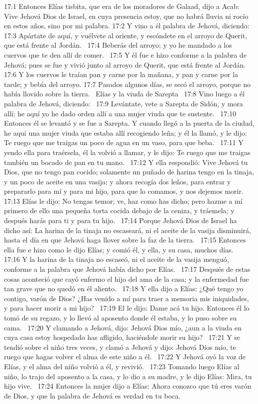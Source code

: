 17:1 Entonces Elías tisbita, que era de los moradores de Galaad, dijo a Acab: Vive Jehová Dios de Israel, en cuya presencia estoy, que no habrá lluvia ni rocío en estos años, sino por mi palabra. 
17:2 Y vino a él palabra de Jehová, diciendo:  
17:3 Apártate de aquí, y vuélvete al oriente, y escóndete en el arroyo de Querit, que está frente al Jordán.  
17:4 Beberás del arroyo; y yo he mandado a los cuervos que te den allí de comer.  
17:5 Y él fue e hizo conforme a la palabra de Jehová; pues se fue y vivió junto al arroyo de Querit, que está frente al Jordán.  
17:6 Y los cuervos le traían pan y carne por la mañana, y pan y carne por la tarde; y bebía del arroyo. 
17:7 Pasados algunos días, se secó el arroyo, porque no había llovido sobre la tierra.  
Elías y la viuda de Sarepta  
17:8 Vino luego a él palabra de Jehová, diciendo:  
17:9 Levántate, vete a Sarepta de Sidón, y mora allí; he aquí yo he dado orden allí a una mujer viuda que te sustente.  
17:10 Entonces él se levantó y se fue a Sarepta. Y cuando llegó a la puerta de la ciudad, he aquí una mujer viuda que estaba allí recogiendo leña; y él la llamó, y le dijo: Te ruego que me traigas un poco de agua en un vaso, para que beba.  
17:11 Y yendo ella para traérsela, él la volvió a llamar, y le dijo: Te ruego que me traigas también un bocado de pan en tu mano.  
17:12 Y ella respondió: Vive Jehová tu Dios, que no tengo pan cocido; solamente un puñado de harina tengo en la tinaja, y un poco de aceite en una vasija; y ahora recogía dos leños, para entrar y prepararlo para mí y para mi hijo, para que lo comamos, y nos dejemos morir. 
17:13 Elías le dijo: No tengas temor; ve, haz como has dicho; pero hazme a mí primero de ello una pequeña torta cocida debajo de la ceniza, y tráemela; y después harás para ti y para tu hijo.  
17:14 Porque Jehová Dios de Israel ha dicho así: La harina de la tinaja no escaseará, ni el aceite de la vasija disminuirá, hasta el día en que Jehová haga llover sobre la faz de la tierra.  
17:15 Entonces ella fue e hizo como le dijo Elías; y comió él, y ella, y su casa, muchos días.  
17:16 Y la harina de la tinaja no escaseó, ni el aceite de la vasija menguó, conforme a la palabra que Jehová había dicho por Elías.  
17:17 Después de estas cosas aconteció que cayó enfermo el hijo del ama de la casa; y la enfermedad fue tan grave que no quedó en él aliento.  
17:18 Y ella dijo a Elías: ¿Qué tengo yo contigo, varón de Dios? ¿Has venido a mí para traer a memoria mis iniquidades, y para hacer morir a mi hijo?  
17:19 El le dijo: Dame acá tu hijo. Entonces él lo tomó de su regazo, y lo llevó al aposento donde él estaba, y lo puso sobre su cama.  
17:20 Y clamando a Jehová, dijo: Jehová Dios mío, ¿aun a la viuda en cuya casa estoy hospedado has afligido, haciéndole morir su hijo?  
17:21 Y se tendió sobre el niño tres veces, y clamó a Jehová y dijo: Jehová Dios mío, te ruego que hagas volver el alma de este niño a él.  
17:22 Y Jehová oyó la voz de Elías, y el alma del niño volvió a él, y revivió.  
17:23 Tomando luego Elías al niño, lo trajo del aposento a la casa, y lo dio a su madre, y le dijo Elías: Mira, tu hijo vive.  
17:24 Entonces la mujer dijo a Elías: Ahora conozco que tú eres varón de Dios, y que la palabra de Jehová es verdad en tu boca.  
